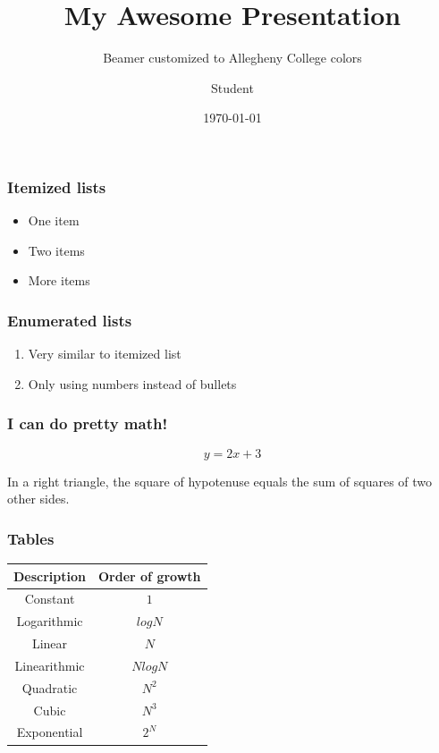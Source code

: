 \documentclass{beamer}
\title{My Awesome Presentation}
\subtitle{Beamer customized to Allegheny College colors}
\author{Student}
\date{\today}
\begin{document}
\begin{frame}
  \titlepage
\end{frame}

\begin{frame}
  \frametitle{Itemized lists}
 	\begin{itemize}
        \item One item
        \item Two items
        \item More items
    \end{itemize}
\end{frame}
\begin{frame}
  \frametitle{Enumerated lists}
	\begin{enumerate}
        \item Very similar to itemized list
        \item Only using numbers instead of bullets
    \end{enumerate}
\end{frame}
\begin{frame}
  \frametitle{I can do pretty math!}
	\begin{equation}
	y = 2x + 3
	\end{equation}
    \begin{theorem}
  		In a right triangle, the square of hypotenuse equals
  		the sum of squares of two other sides.
	\end{theorem}

\end{frame}
\begin{frame}
  \frametitle{Tables}
  \begin{center}
	\begin{tabular}{|c|c|}
		\hline 
        \textbf{Description} & \textbf{Order of growth} \\
        \hline 
        Constant & $1$ \\
        Logarithmic & $log N$ \\
        Linear & $N$ \\
        Linearithmic & $N log N$ \\
        Quadratic & $N^2$ \\
        Cubic & $N^3$ \\
        Exponential & $2^N$\\
        \hline
    \end{tabular}
    \end{center}
\end{frame}
\end{document}
